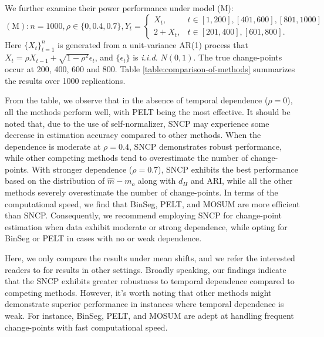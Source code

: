 {
We further examine their power performance under model (M):
$$
(\mathrm{M}): n=1000, \rho\in\{0,0.4,0.7\},  Y_t= \begin{cases}
X_t, & t \in[1,200], [401,600], [801,1000]\\ 2+X_t, & t \in[201,400], [601,800] .
\end{cases}
$$
Here  $\{X_t\}_{t=1}^{n}$ is generated from a unit-variance AR(1) process that $X_t=\rho X_{t-1}+\sqrt{1-\rho^2}\epsilon_t$, and $\{\epsilon_t\}$ is \textit{i.i.d.} $N(0,1)$. The true change-points occur at 200, 400, 600 and 800.  Table \ref{table:comparison-of-methods} summarizes the results over 1000 replications. 


From the table, we observe that in the absence of temporal dependence ($\rho=0$), all the methods perform well, with PELT being the most effective. It should be noted that, due to the use of self-normalizer, SNCP may experience some decrease in estimation accuracy compared to other methods.  When the dependence is moderate at $\rho=0.4$, SNCP demonstrates robust performance, while other competing methods tend to overestimate the number of change-points. With stronger dependence ($\rho=0.7$), SNCP exhibits the best performance based on the distribution of $\hat{m}-m_o$ along with $d_H$ and ARI, while all the other methods severely overestimate the number of change-points.  In terms of the computational speed, we find that BinSeg, PELT, and MOSUM are more efficient than SNCP. Consequently, we recommend employing SNCP for change-point estimation when data exhibit moderate or strong dependence, while opting for BinSeg or PELT in cases with no or weak  dependence.} 

{Here, we only compare the results under mean shifts, and we refer the interested readers to \cite{zhao2021segmenting} for results in other settings. Broadly speaking, our findings indicate that the SNCP exhibits greater robustness to temporal dependence compared to competing methods. However, it's worth noting that other methods might demonstrate superior performance in instances where temporal dependence is weak. For instance, BinSeg, PELT, and MOSUM are adept at handling frequent change-points with fast computational speed.} 

